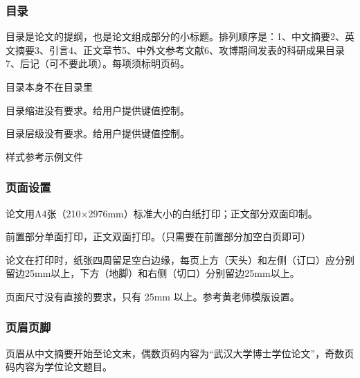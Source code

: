 \subsubsection{目录}

\begin{reference}
  目录是论文的提纲，也是论文组成部分的小标题。排列顺序是：1、中文摘要2、英文摘要3、引言4、正文章节5、中外文参考文献6、攻博期间发表的科研成果目录7、后记（可不要此项）。每项须标明页码。
\end{reference}

\begin{points}
  \item 目录本身不在目录里
  \item 目录缩进没有要求。给用户提供键值控制。
  \item 目录层级没有要求。给用户提供键值控制。
  \item 样式参考示例文件
\end{points}


\subsubsection{页面设置}

\begin{reference}
  论文用A4张（210×2976mm）标准大小的白纸打印；正文部分双面印制。
\end{reference}

\begin{points}
  \item 前置部分单面打印，正文双面打印。（只需要在前置部分加空白页即可）
\end{points}

\begin{reference}
  论文在打印时，纸张四周留足空白边缘，每页上方（天头）和左侧（订口）应分别留边25mm以上，下方（地脚）和右侧（切口）分别留边25mm以上。
\end{reference}

\begin{points}
  \item 页面尺寸没有直接的要求，只有 25mm 以上。参考黄老师模版设置。
\end{points}


\subsubsection{页眉页脚}

\begin{reference}
  页眉从中文摘要开始至论文末，偶数页码内容为“武汉大学博士学位论文”，奇数页码内容为学位论文题目。
\end{reference}

